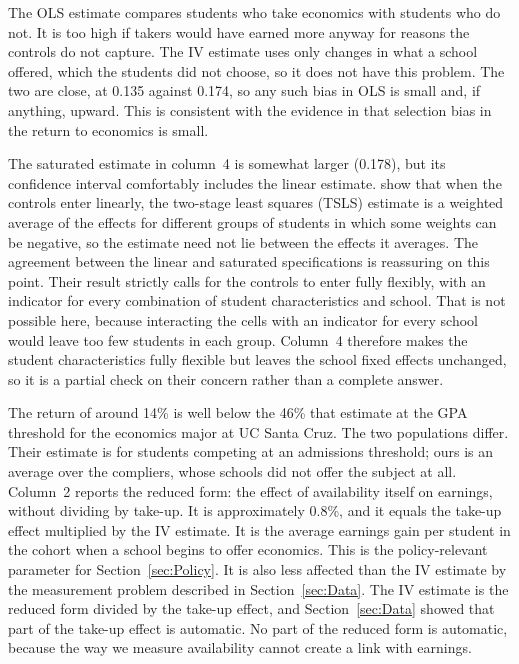 

The OLS estimate compares students who take economics with students who do not. It is too high if takers would have earned more anyway for reasons the controls do not capture. The IV estimate uses only changes in what a school offered, which the students did not choose, so it does not have this problem. The two are close, at 0.135 against 0.174, so any such bias in OLS is small and, if anything, upward. This is consistent with the evidence in \citet{bleemer2022college} that selection bias in the return to economics is small.

The saturated estimate in column~4 is somewhat larger (0.178), but its confidence interval comfortably includes the linear estimate. \citet{blandhol2022tsls} show that when the controls enter linearly, the two-stage least squares (TSLS) estimate is a weighted average of the effects for different groups of students in which some weights can be negative, so the estimate need not lie between the effects it averages. The agreement between the linear and saturated specifications is reassuring on this point. Their result strictly calls for the controls to enter fully flexibly, with an indicator for every combination of student characteristics and school. That is not possible here, because interacting the cells with an indicator for every school would leave too few students in each group. Column~4 therefore makes the student characteristics fully flexible but leaves the school fixed effects unchanged, so it is a partial check on their concern rather than a complete answer.

The return of around 14\% is well below the 46\% that \citet{bleemer2022college} estimate at the GPA threshold for the economics major at UC Santa Cruz. The two populations differ. Their estimate is for students competing at an admissions threshold; ours is an average over the compliers, whose schools did not offer the subject at all. Column~2 reports the reduced form: the effect of availability itself on earnings, without dividing by take-up. It is approximately 0.8\%, and it equals the take-up effect multiplied by the IV estimate. It is the average earnings gain per student in the cohort when a school begins to offer economics. This is the policy-relevant parameter for Section~\ref{sec:Policy}. It is also less affected than the IV estimate by the measurement problem described in Section~\ref{sec:Data}. The IV estimate is the reduced form divided by the take-up effect, and Section~\ref{sec:Data} showed that part of the take-up effect is automatic. No part of the reduced form is automatic, because the way we measure availability cannot create a link with earnings.


